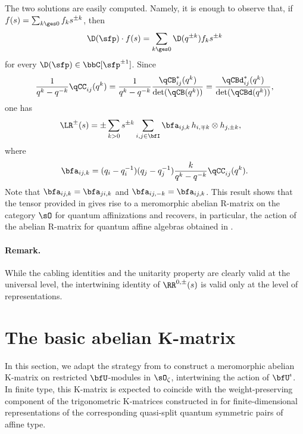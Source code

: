 \documentclass[reqno]{amsart}
\numberwithin{equation}{section}
\newenvironment{remark}{\medskip\paragraph{{\bf Remark.}}}{\par\medskip}
\begin{document}
The two solutions are easily computed. Namely, it is enough to observe that, if
$f(s)=\sum_{k\ges0}f_ks^{\pm k}$, then
\[\D(\sfp)\cdot f(s)=\sum_{k\ges 0}\D(q^{\pm k})f_ks^{\pm k}\]
for every $\D(\sfp)\in\bbC[\sfp^{\pm1}]$. Since 
\begin{equation}
\frac{1}{q^k-q^{-k}}\qCC_{ij}(q^k)
=\frac{1}{q^k-q^{-k}}\frac{\qCB^*_{ij}(q^k)}{\det(\qCB(q^k))}
=\frac{\qCBd^*_{ij}(q^k)}{\det(\qCBd(q^k))},
\end{equation} 
one has
\begin{equation}\label{eq:log-R}
\begin{aligned}
	\LR^{\pm}(s)&=\pm\sum_{k>0}s^{\pm k}\sum_{i,j\in\bfI}
	\bfa_{ij,k}\,h_{i,\mp k}\otimes h_{j,\pm k},
\end{aligned}
\end{equation}
where
\begin{equation}\label{eq:def-coeff-a}
\begin{aligned}
	\bfa_{ij, k}=(q_i-q_i^{-1})(q_j-q_j^{-1})\frac{k}{q^k-q^{-k}}\qCC_{ij}(q^{k}).
\end{aligned}
\end{equation}
Note that $\bfa_{ij,k}=\bfa_{ji,k}$ and $\bfa_{ij,-k}=\bfa_{ij,k}$.
This result shows that the tensor provided in \cite{hernandez-05} 
gives rise to a meromorphic abelian R-matrix on the category $\sO$ for quantum affinizations and recovers, in particular, the action of the abelian R-matrix for quantum affine algebras obtained in \cite{khoroshkin-tolstoy-93,levendorskii-soibelman-stukopin-93,damiani-98, gautam-toledano-17}.

\begin{remark}
While the cabling identities and the unitarity property are clearly valid at the universal level, the intertwining identity of $\RR^{0,\pm}(s)$ is valid only at the level of representations.
\hfill\rmkend 
\end{remark}

\section{The basic abelian K-matrix}
\label{s:basic-abelian-K-matrix}

In this section, we adapt the strategy from \cite{appel-gautam-26} to construct 
a meromorphic abelian K-matrix on restricted $\bfU$-modules in $\sO_\zeta$, intertwining the action of $\bfU^\imath$. In finite type, this K-matrix is expected to coincide with the weight-preserving component of the trigonometric K-matrices constructed in \cite{appel-vlaar-25a} for finite-dimensional representations of the corresponding quasi-split quantum symmetric pairs of affine type.
\end{document}
